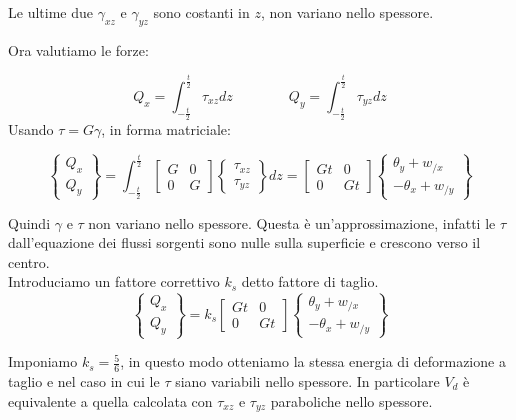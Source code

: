 Le ultime due $\gamma_{xz}$ e $\gamma_{yz}$ sono costanti in $z$, non variano nello spessore.

Ora valutiamo le forze:

\begin{equation*}
    Q_x=\int_{-\frac{t}{2}}^{\frac{t}{2}} \tau_{xz}dz \qquad\qquad  Q_y=\int_{-\frac{t}{2}}^{\frac{t}{2}} \tau_{yz}dz 
\end{equation*}
Usando $\tau=G\gamma$, in forma matriciale:

\begin{equation*}
    \begin{Bmatrix}
        Q_x \\
        Q_y
    \end{Bmatrix}
    =
    \int_{-\frac{t}{2}}^{\frac{t}{2}}
    \left[
\begin{array}{ccc}
\displaystyle G & \displaystyle 0 \\
\displaystyle 0& \displaystyle G 
\end{array}
\right]
    \begin{Bmatrix}
        \tau_{xz} \\
        \tau_{yz}
    \end{Bmatrix}
    dz=
        \left[
\begin{array}{ccc}
\displaystyle Gt & \displaystyle 0 \\
\displaystyle 0& \displaystyle G t
\end{array}
\right]
    \begin{Bmatrix}
        \theta_y+ w_{/x} \\
        -\theta_x+ w_{/y}
    \end{Bmatrix}    
\end{equation*}

Quindi $\gamma$ e $\tau$ non variano nello spessore. Questa è un'approssimazione, infatti le $\tau$ dall'equazione dei flussi sorgenti sono nulle sulla superficie e crescono verso il centro.\\
Introduciamo un fattore correttivo $k_s$ detto fattore di taglio.
\begin{equation*}
    \begin{Bmatrix}
        Q_x \\
        Q_y
    \end{Bmatrix}
   =k_s
        \left[
\begin{array}{ccc}
\displaystyle Gt & \displaystyle 0 \\
\displaystyle 0& \displaystyle G t
\end{array}
\right]
    \begin{Bmatrix}
        \theta_y+ w_{/x} \\
        -\theta_x+ w_{/y}
    \end{Bmatrix}
\end{equation*}

Imponiamo $k_s=\frac{5}{6}$, in questo modo otteniamo la stessa energia di deformazione a taglio e nel caso in cui le $\tau$ siano variabili nello spessore. In particolare $V_d$ è equivalente a quella calcolata con $\tau_{xz}$ e $\tau_{yz}$ paraboliche nello spessore.